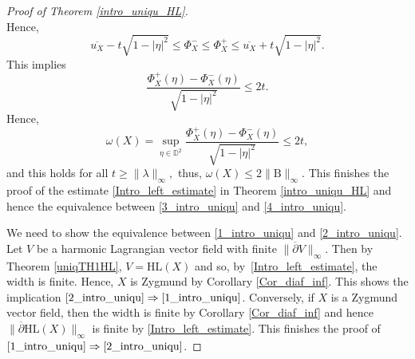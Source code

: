 \documentclass[11pt]{article}
\theoremstyle{plain}
\theoremstyle{definition}
\newcommand{\B}{\mathrm{B}}
\begin{document}
\begin{proof}[Proof of Theorem \ref{intro_uniqu_HL}]
\[\]
Hence,
\[
\overline{u_X} - t \sqrt{1 - \lvert \eta \rvert^2} \leq \Phi_X^- \leq \Phi_X^+ \leq \overline{u_X} + t \sqrt{1 - \lvert \eta \rvert^2}.
\]
This implies
\[
\frac{\Phi_X^+(\eta) - \Phi_X^-(\eta)}{\sqrt{1 - \lvert \eta \rvert^2}} \leq 2t.
\]
Hence,
\[
\omega(X) = \sup_{\eta \in \mathbb{D}^2} \frac{\Phi_X^+(\eta) - \Phi_X^-(\eta)}{\sqrt{1 - \lvert \eta \rvert^2}} \leq 2t,
\]
and this holds for all \(t \geq \lVert \lambda \rVert_{\infty}, \) thus, \(\omega(X) \leq 2 \lVert \B\rVert_{\infty}. \) This finishes the proof of the estimate \eqref{Intro_left_estimate} in Theorem \ref{intro_uniqu_HL} and hence the equivalence between \eqref{3_intro_uniqu} and \eqref{4_intro_uniqu}.

We need to show the equivalence between \eqref{1_intro_uniqu} and \eqref{2_intro_uniqu}. Let \(V\) be a harmonic Lagrangian vector field with finite \(\lVert \overline{\partial} V \rVert_{\infty}\). Then by Theorem \ref{uniqTH1HL}, \(V = \mathrm{HL}(X)\) and so, by~\eqref{Intro_left_estimate}, the width is finite. Hence, \(X\) is Zygmund by Corollary \ref{Cor_diaf_inf}. This shows the implication $\eqref{2_intro_uniqu} \Rightarrow \eqref{1_intro_uniqu}$. Conversely, if \(X\) is a Zygmund vector field, then the width is finite by Corollary \ref{Cor_diaf_inf} and hence \(\lVert \overline{\partial} \mathrm{HL}(X) \rVert_{\infty}\) is finite by \eqref{Intro_left_estimate}. This finishes the proof of $\eqref{1_intro_uniqu} \Rightarrow\eqref{2_intro_uniqu}$.
\end{proof}
\end{document}

